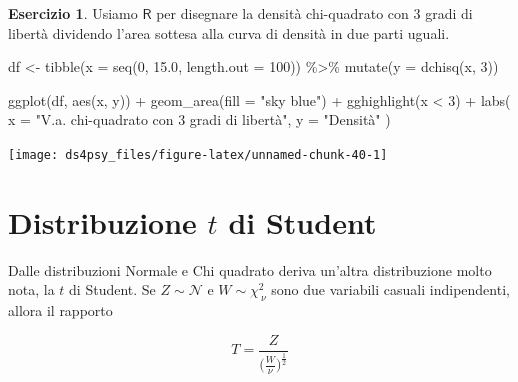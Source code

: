 \documentclass[
  11pt,
]{krantz}
\makeatletter
\newenvironment{Shaded}{\begin{snugshade}}{\end{snugshade}}
\newcommand{\AttributeTok}[1]{\textcolor[rgb]{0.61,0.61,0.61}{#1}}
\newcommand{\DecValTok}[1]{\textcolor[rgb]{0.06,0.06,0.06}{#1}}
\newcommand{\FloatTok}[1]{\textcolor[rgb]{0.06,0.06,0.06}{#1}}
\newcommand{\FunctionTok}[1]{\textcolor[rgb]{0,0,0}{#1}}
\newcommand{\NormalTok}[1]{#1}
\newcommand{\OtherTok}[1]{\textcolor[rgb]{0.37,0.37,0.37}{#1}}
\newcommand{\SpecialCharTok}[1]{\textcolor[rgb]{0,0,0}{#1}}
\newcommand{\StringTok}[1]{\textcolor[rgb]{0.5,0.5,0.5}{#1}}
\newenvironment{kframe}{%
\medskip{}
\setlength{\fboxsep}{.8em}
 \def\at@end@of@kframe{}%
 \ifinner\ifhmode%
  \def\at@end@of@kframe{\end{minipage}}%
  \begin{minipage}{\columnwidth}%
 \fi\fi%
 \def\FrameCommand##1{\hskip\@totalleftmargin \hskip-\fboxsep
 \colorbox{shadecolor}{##1}\hskip-\fboxsep
     \hskip-\linewidth \hskip-\@totalleftmargin \hskip\columnwidth}%
 \MakeFramed {\advance\hsize-\width
   \@totalleftmargin\z@ \linewidth\hsize
   \@setminipage}}%
 {\par\unskip\endMakeFramed%
 \at@end@of@kframe}
\renewenvironment{Shaded}{\begin{kframe}}{\end{kframe}}
\newcommand{\R}{\textsf{R}} %
\theoremstyle{definition}
\theoremstyle{definition}
\theoremstyle{definition}
\newtheorem{exercise}{Esercizio}[chapter]
\theoremstyle{definition}
\theoremstyle{remark}
\makeatother
\begin{document}
\begin{exercise}

Usiamo \(\R\) per disegnare la densità chi-quadrato con 3 gradi di libertà dividendo l'area sottesa alla curva di densità in due parti uguali.

\begin{Shaded}
\begin{Highlighting}[]
\NormalTok{df }\OtherTok{\textless{}{-}} \FunctionTok{tibble}\NormalTok{(}\AttributeTok{x =} \FunctionTok{seq}\NormalTok{(}\DecValTok{0}\NormalTok{, }\FloatTok{15.0}\NormalTok{, }\AttributeTok{length.out =} \DecValTok{100}\NormalTok{)) }\SpecialCharTok{\%\textgreater{}\%}
  \FunctionTok{mutate}\NormalTok{(}\AttributeTok{y =} \FunctionTok{dchisq}\NormalTok{(x, }\DecValTok{3}\NormalTok{))}

\FunctionTok{ggplot}\NormalTok{(df, }\FunctionTok{aes}\NormalTok{(x, y)) }\SpecialCharTok{+}
  \FunctionTok{geom\_area}\NormalTok{(}\AttributeTok{fill =} \StringTok{"sky blue"}\NormalTok{) }\SpecialCharTok{+}
  \FunctionTok{gghighlight}\NormalTok{(x }\SpecialCharTok{\textless{}} \DecValTok{3}\NormalTok{) }\SpecialCharTok{+}
  \FunctionTok{labs}\NormalTok{(}
    \AttributeTok{x =} \StringTok{"V.a. chi{-}quadrato con 3 gradi di libertà"}\NormalTok{,}
    \AttributeTok{y =} \StringTok{"Densità"}
\NormalTok{  )}
\end{Highlighting}
\end{Shaded}

\begin{center}\texttt{[image: ds4psy\_files/figure-latex/unnamed-chunk-40-1]} \end{center}

\end{exercise}

\hypertarget{distribuzione-t-di-student}{%
\section{\texorpdfstring{Distribuzione \(t\) di Student}{Distribuzione t di Student}}\label{distribuzione-t-di-student}}

Dalle distribuzioni Normale e Chi quadrato deriva un'altra distribuzione molto nota, la \(t\) di Student. Se \(Z \sim \mathcal{N}\) e \(W \sim \chi^2_{~\nu}\) sono due variabili casuali indipendenti, allora il rapporto

\begin{equation}
T = \frac{Z}{\Big( \frac{W}{\nu}\Big)^{\frac{1}{2}}}
\end{equation}
\end{document}
